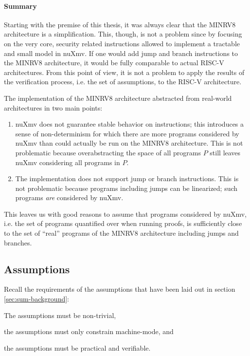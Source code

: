 \paragraph{Summary}

Starting with the premise of this thesis, it was always clear that the MINRV8 architecture is a simplification.
This, though, is not a problem since by focusing on the very core, security related instructions allowed to implement a tractable and small model in nuXmv.
If one would add jump and branch instructions to the MINRV8 architecture, it would be fully comparable to actual RISC-V architectures.
From this point of view, it is not a problem to apply the results of the verification process, i.e. the set of assumptions, to the RISC-V architecture.

The implementation of the MINRV8 architecture abstracted from real-world architectures in two main points:
\begin{enumerate}
    \item nuXmv does not guarantee stable behavior on  instructions; this introduces a sense of non-determinism for which there are more programs considered by nuXmv than could actually be run on the MINRV8 architecture.
    This is not problematic because overabstracting the space of all programs $ P $ still leaves nuXmv considering all programs in $ P $.
    \item The implementation does not support jump or branch instructions.
    This is not problematic because programs including jumps can be linearized; such programs \textit{are} considered by nuXmv.
\end{enumerate}

This leaves us with good reasons to assume that programs considered by nuXmv, i.e. the set of programs quantified over when running proofs, is sufficiently close to the set of \enquote{real} programs of the MINRV8 architecture including jumps and branches.

\subsection{Assumptions}

Recall the requirements of the assumptions that have been laid out in section \ref{sec:sum-background}:
\begin{enumerate*}
    \item The assumptions must be non-trivial,
    \item the assumptions must only constrain machine-mode, and
    \item the assumptions must be practical and verifiable.
\end{enumerate*}


